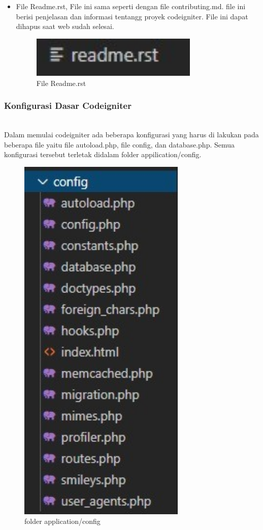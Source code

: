 \begin{itemize}
\begin{itemize}
		\item File Readme.rst, File ini sama seperti dengan file contributing.md. file ini berisi penjelasan dan informasi tentangg proyek codeigniter. File ini dapat dihapus saat web sudah selesai.	
		\begin{figure}[H]
			\includegraphics[width=8cm]{figures/instalasi/ci16.jpg}
			\centering
			\caption{File Readme.rst}
		\end{figure}		
	\end{itemize}
\end{itemize}

\subsubsection{Konfigurasi Dasar Codeigniter}
\hfill\\
Dalam memulai codeigniter ada beberapa konfigurasi yang harus di lakukan pada beberapa file yaitu file autoload.php, file config, dan database.php. Semua konfigurasi tersebut terletak didalam folder appilication/config.
	\begin{figure}[H]
		\includegraphics[width=8cm]{figures/instalasi/ci27-1.jpg}
		\centering
		\caption{folder application/config}
	\end{figure}
